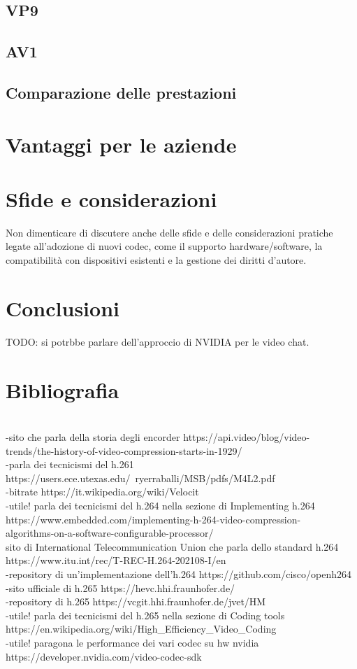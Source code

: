 \documentclass[a4paper,12pt, oneside]{article}
\begin{document}
\subsection{VP9}    %
\subsection{AV1}
\subsection{Comparazione delle prestazioni}

\section{Vantaggi per le aziende}

\section{Sfide e considerazioni}
Non dimenticare di discutere anche delle sfide e delle considerazioni pratiche legate all'adozione di nuovi codec, come il supporto hardware/software, la compatibilità con dispositivi esistenti e la gestione dei diritti d'autore.

\section{Conclusioni}
TODO: si potrbbe parlare dell'approccio di NVIDIA per le video chat.

\section{Bibliografia}
\\-sito che parla della storia degli encorder https://api.video/blog/video-trends/the-history-of-video-compression-starts-in-1929/
\\-parla dei tecnicismi del h.261 https://users.ece.utexas.edu/~ryerraballi/MSB/pdfs/M4L2.pdf
\\-bitrate https://it.wikipedia.org/wiki/Velocit%
\\-utile! parla dei tecnicismi del h.264 nella sezione di Implementing h.264 https://www.embedded.com/implementing-h-264-video-compression-\\algorithms-on-a-software-configurable-processor/
\\ sito di International Telecommunication Union che parla dello standard h.264 https://www.itu.int/rec/T-REC-H.264-202108-I/en
\\-repository di un'implementazione dell'h.264 https://github.com/cisco/openh264
\\-sito ufficiale di h.265 https://hevc.hhi.fraunhofer.de/
\\-repository di h.265 https://vcgit.hhi.fraunhofer.de/jvet/HM
\\-utile! parla dei tecnicismi del h.265 nella sezione di Coding tools https://en.wikipedia.org/wiki/High_Efficiency_Video_Coding
\\-utile! paragona le performance dei vari codec su hw nvidia https://developer.nvidia.com/video-codec-sdk
\end{document}
